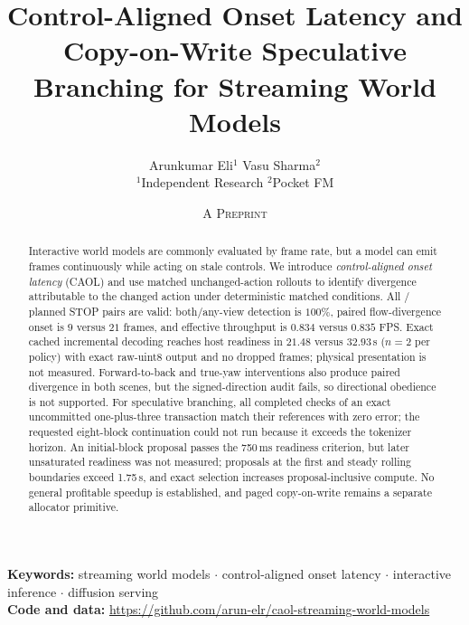 \documentclass[11pt]{article}
\title{Control-Aligned Onset Latency and\\
Copy-on-Write Speculative Branching for Streaming World Models}
\author{%
Arunkumar Eli$^{1}$ \qquad Vasu Sharma$^{2}$\\[0.4em]
\small $^{1}$Independent Research \qquad $^{2}$Pocket FM
}
\date{\textsc{A Preprint}}
\newcommand{\caol}{CAOL}
\begin{document}
\maketitle
\vspace{-1.6em}

\begin{abstract}
\footnotesize
Interactive world models are commonly evaluated by frame rate, but a model can emit frames continuously while acting on stale controls. We introduce \emph{control-aligned onset latency} (\caol{}) and use matched unchanged-action rollouts to identify divergence attributable to the changed action under deterministic matched conditions. All \ValidPairs{}/\ExpectedPairs{} planned STOP pairs are valid: both/any-view detection is $100\%$, paired flow-divergence onset is $9$ versus $21$ frames, and effective throughput is $0.834$ versus $0.835$ FPS. Exact cached incremental decoding reaches host readiness in $21.48$ versus $32.93$\,s ($n=2$ per policy) with exact raw-uint8 output and no dropped frames; physical presentation is not measured. Forward-to-back and true-yaw interventions also produce paired divergence in both scenes, but the signed-direction audit fails, so directional obedience is not supported. For speculative branching, all \ProposalCheckpointCount{} completed checks of an exact uncommitted one-plus-three transaction match their references with zero error; the requested eight-block continuation could not run because it exceeds the tokenizer horizon. An initial-block proposal passes the 750\,ms readiness criterion, but later unsaturated readiness was not measured; proposals at the first and steady rolling boundaries exceed 1.75\,s, and exact selection increases proposal-inclusive compute. No general profitable speedup is established, and paged copy-on-write remains a separate allocator primitive.
\end{abstract}

\vspace{-0.35em}
\begin{center}
\small\textbf{Keywords:} streaming world models $\cdot$ control-aligned onset latency $\cdot$ interactive inference $\cdot$ diffusion serving\\[0.3em]
\small\textbf{Code and data:} \url{https://github.com/arun-elr/caol-streaming-world-models}
\end{center}
\vspace{-0.75em}
\end{document}
